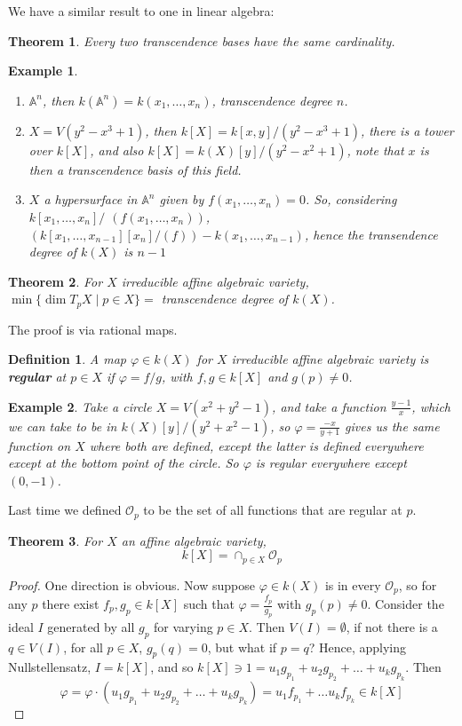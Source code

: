 \documentclass[12pt]{article}
\newcommand{\A}{\mathbb{A}}
\renewcommand{\O}{\mathcal{O}}
\renewcommand{\phi}{\varphi}
\newtheorem{definition}{Definition}[section]
\newtheorem*{example}{Example}
\newtheorem{theorem}{Theorem}[section]
\begin{document}
    We have a similar result to one in linear algebra:
    \begin{theorem}
        Every two transcendence bases have the same cardinality. 
    \end{theorem}
    \begin{example}
        \begin{enumerate}
            \item $\A^n$, then $k(\A^n) = k(x_1, \dots, x_n)$, transcendence degree $n$.
            \item $X = V(y^2 - x^3 + 1)$, then $k[X] = k[x, y]/(y^2 - x^3 + 1)$, there is a tower over $k[X]$, and also $k[X] = k(X)[y]/(y^2 - x^2 + 1)$, note that $x$ is then a transcendence basis of this field. 
            \item $X$ a hypersurface in $\A^n$ given by $f(x_1, \dots, x_n) = 0$. So, considering $k[x_1, \dots, x_n]/$ $(f(x_1, \dots, x_n))$, $(k[x_1, \dots, x_{n-1}][x_n]/(f)) - k(x_1, \dots, x_{n-1})$, hence the transendence degree of $k(X)$ is $n-1$
        \end{enumerate}
    \end{example}
    \begin{theorem} \label{thm:dim_equiv}
        For $X$ irreducible affine algebraic variety, $\min \{\dim T_pX \mid p \in X\} = $ transcendence degree of $k(X)$. 
    \end{theorem}
    The proof is via rational maps. 
    \begin{definition}
        A map $\phi \in k(X)$ for $X$ irreducible affine algebraic variety is \textbf{regular} at $p \in X$ if $\phi = f/g$, with $f, g \in k[X]$ and $g(p) \neq 0$.  
    \end{definition}
    \begin{example}
        Take a circle $X = V(x^2 + y^2 - 1)$, and take a function $\frac{y-1}{x}$, which we can take to be in $k(X)[y]/(y^2 + x^2 - 1)$, so $\phi = \frac{-x}{y+1}$ gives us the same function on $X$ where both are defined, except the latter is defined everywhere except at the bottom point of the circle. So $\phi$ is regular everywhere except $(0, -1)$. 
    \end{example}
    Last time we defined $\O_p$ to be the set of all functions that are regular at $p$.
    \begin{theorem}
        For $X$ an affine algebraic variety,
        $$k[X] = \cap_{p \in X} \O_p$$
    \end{theorem}
    \begin{proof}
        One direction is obvious. Now suppose $\phi \in k(X)$ is in every $\O_p$, so for any $p$ there exist $f_p, g_p \in k[X]$ such that $\phi = \frac{f_p}{g_p}$ with $g_p(p) \neq 0$. Consider the ideal $I$ generated by all $g_p$ for varying $p \in X$. Then $V(I) = \emptyset$, if not there is a $q \in V(I)$, for all $p \in X$, $g_p(q) = 0$, but what if $p = q$? Hence, applying Nullstellensatz, $I = k[X]$, and so $k[X] \ni 1 = u_1g_{p_1} + u_2g_{p_2} + \dots + u_kg_{p_k}$. Then 
        $$\phi = \phi \cdot (u_1g_{p_1} + u_2g_{p_2} + \dots + u_kg_{p_k}) = u_1f_{p_1} + \dots u_kf_{p_k} \in k[X]$$
    \end{proof}
\end{document}
